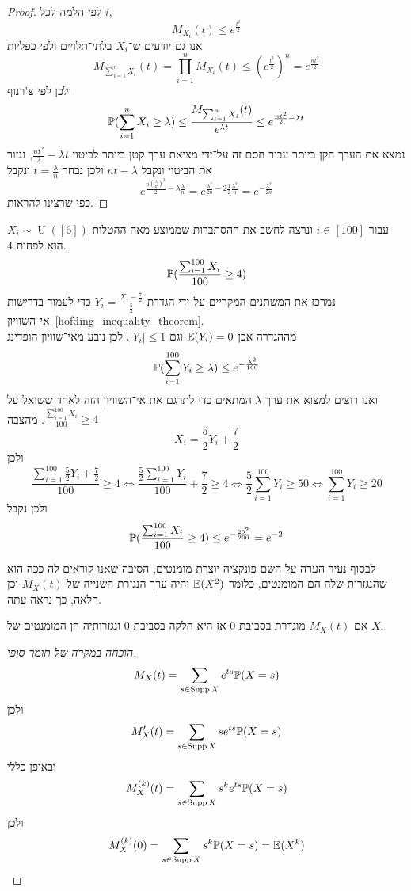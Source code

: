 \begin{proof}
	לפי הלמה לכל $i$,
	\[
		M_{X_i}(t) \le e^{\frac{t^2}{2}}
	\]
	אנו גם יודעים ש־$X_i$ בלתי־תלויים ולפי כפליות
	\[
		M_{\sum_{i = 1}^{n} X_i}(t)
		= \prod_{i = 1}^n M_{X_i}(t)
		\le {(e^{\frac{t^2}{2}})}^n
		= e^{\frac{nt^2}{2}}
	\]
	ולכן לפי צ'רנוף
	\[
		\mathbb{P}(\sum_{i = 1}^{n} X_i \ge \lambda)
		\le \frac{M_{\sum_{i = 1}^{n} X_i}(t)}{e^{\lambda t}}
		\le e^{\frac{nt^2}{2} - \lambda t}
	\]
	נמצא את הערך הקן ביותר עבור חסם זה על־ידי מציאת ערך קטן ביותר לביטוי $\frac{n t^2}{2} - \lambda t$, נגזור את הביטוי ונקבל $nt - \lambda$ ולכן נבחר $t = \frac{\lambda}{n}$ ונקבל
	\[
		e^{\frac{n {(\frac{\lambda}{n})}^2}{2} - \lambda \frac{\lambda}{n}}
		= e^{\frac{\lambda^2}{2n} - 2 \frac{1}{2}\frac{\lambda^2}{n}}
		= e^{-\frac{\lambda^2}{2n}}
	\]
	כפי שרצינו להראות.
\end{proof}
\begin{example}
	$X_i \sim \operatorname{U}([6])$ עבור $i \in [100]$ ונרצה לחשב את ההסתברות שממוצע מאה ההטלות הוא לפחות 4.
	\[
		\mathbb{P}(\frac{\sum_{i = 1}^{100} X_i}{100} \ge 4)
	\]
	נמרכז את המשתנים המקריים על־ידי הגדרת $Y_i = \frac{X_i - \frac{7}{2}}{\frac{5}{2}}$ כדי לעמוד בדרישות אי־השוויון\ \ref{hofding_inequality_theorem}. \\
	מההגדרה אכן $\mathbb{E}(Y_i) = 0$ וגם $|Y_i| \le 1$.
	לכן נובע מאי־שוויון הופדינג
	\[
		\mathbb{P}(\sum_{i = 1}^{100} Y_i \ge \lambda)
		\le e^{- \frac{\lambda^2}{100}}
	\]
	ואנו רוצים למצוא את ערך $\lambda$ המתאים כדי לתרגם את אי־השוויון הזה לאחד ששואל על $\frac{\sum_{i = 1}^{100} X_i}{100} \ge 4$.
	מהצבה
	\[
		X_i = \frac{5}{2} Y_i + \frac{7}{2}
	\]
	ולכן
	\[
		\frac{\sum_{i = 1}^{100} \frac{5}{2} Y_i + \frac{7}{2}}{100} \ge 4
		\iff
		\frac{\frac{5}{2} \sum_{i = 1}^{100} Y_i}{100} + \frac{7}{2} \ge 4
		\iff
		\frac{5}{2} \sum_{i = 1}^{100} Y_i \ge 50
		\iff
		\sum_{i = 1}^{100} Y_i \ge 20
	\]
	ולכן נקבל
	\[
		\mathbb{P}(\frac{\sum_{i = 1}^{100} X_i}{100} \ge 4)
		\le e^{- \frac{20^2}{200}}
		= e^{-2}
	\]
\end{example}
לבסוף נעיר הערה על השם פונקציה יוצרת מומנטים, הסיבה שאנו קוראים לה ככה הוא שהנגזרות שלה הם המומנטים, כלומר $\mathbb{E}(X^2)$ יהיה ערך הנגזרת השנייה של $M_X(t)$ וכן הלאה, כך נראה עתה.
\begin{proposition}
	אם $M_X(t)$ מוגדרת בסביבת $0$ אז היא חלקה בסביבת $0$ ונגזרותיה הן המומנטים של $X$.
\end{proposition}
\begin{proof}[הוכחה במקרה של תומך סופי]
	\[
		M_X(t)
		= \sum_{s \in \operatorname{Supp} X} e^{ts} \mathbb{P}(X = s)
	\]
	ולכן
	\[
		M_X'(t)
		= \sum_{s \in \operatorname{Supp} X} s e^{ts} \mathbb{P}(X = s)
	\]
	ובאופן כללי
	\[
		M_X^{(k)}(t)
		= \sum_{s \in \operatorname{Supp} X} s^k e^{ts} \mathbb{P}(X = s)
	\]
	ולכן
	\[
		M_X^{(k)}(0)
		= \sum_{s \in \operatorname{Supp} X} s^k \mathbb{P}(X = s)
		= \mathbb{E}(X^k)
	\]
\end{proof}

